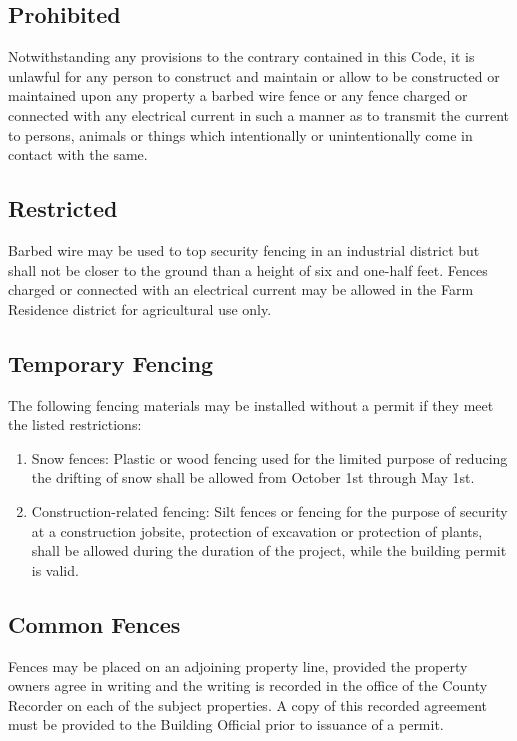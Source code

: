 \subsection{Prohibited}
Notwithstanding any provisions to the contrary contained in this Code, it is unlawful for any person to construct and maintain or allow to be constructed or maintained upon any property a barbed wire fence or any fence charged or connected with any electrical current in such a manner as to transmit the current to persons, animals or things which intentionally or unintentionally come in contact with the same.
\subsection{Restricted}
Barbed wire may be used to top security fencing in an industrial district but shall not be closer to the ground than a height of six and one-half feet.  Fences charged or connected with an electrical current may be allowed in the Farm Residence district for agricultural use only.
\subsection{Temporary Fencing}
The following fencing materials may be installed without a permit if they meet the listed restrictions:
\begin{enumerate}[{\indent}1)]
    \item Snow fences:  Plastic or wood fencing used for the limited purpose of reducing the drifting of snow shall be allowed from October 1st through May 1st.
    \item Construction-related fencing:  Silt fences or fencing for the purpose of security at a construction jobsite, protection of excavation or protection of plants, shall be allowed during the duration of the project, while the building permit is valid.
\end{enumerate}
\subsection{Common Fences}
Fences may be placed on an adjoining property line, provided the property owners agree in writing and the writing is recorded in the office of the County Recorder on each of the subject properties.  A copy of this recorded agreement must be provided to the Building Official prior to issuance of a permit.
